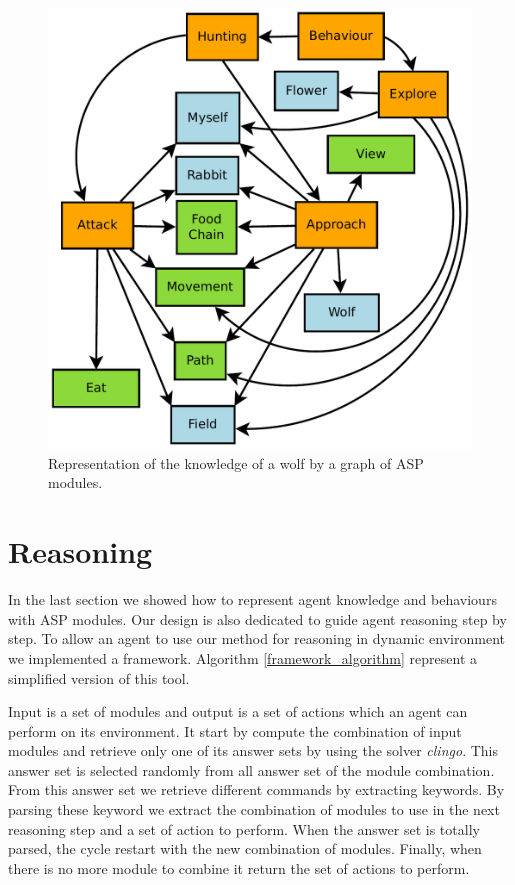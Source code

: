 \documentclass{aamas2012}
\begin{document}
	\begin{figure}
		\centering
		\includegraphics[keepaspectratio=true, scale=0.4]{knowledge_organisation.pdf}
		\caption
		{
			\label{organisation_figure}
			Representation of the knowledge of a wolf by a graph of ASP modules.
		}
	\end{figure}
	
\section{Reasoning}

	In the last section we showed how to represent agent knowledge and behaviours with ASP modules.
	Our design is also dedicated to guide agent reasoning step by step.
	To allow an agent to use our method for reasoning in dynamic environment we implemented a framework.
	Algorithm \ref{framework_algorithm} represent a simplified version of this tool.
	
	Input is a set of modules and output is a set of actions which an agent can perform on its environment.
	It start by compute the combination of input modules and retrieve only one of its answer sets by using the solver \emph{clingo}.
	This answer set is selected randomly from all answer set of the module combination.
	From this answer set we retrieve different commands by extracting keywords.
	By parsing these keyword we extract the combination of modules to use in the next reasoning step and a set of action to perform.
	When the answer set is totally parsed, the cycle restart with the new combination of modules.
	Finally, when there is no more module to combine it return the set of actions to perform.
\end{document}
